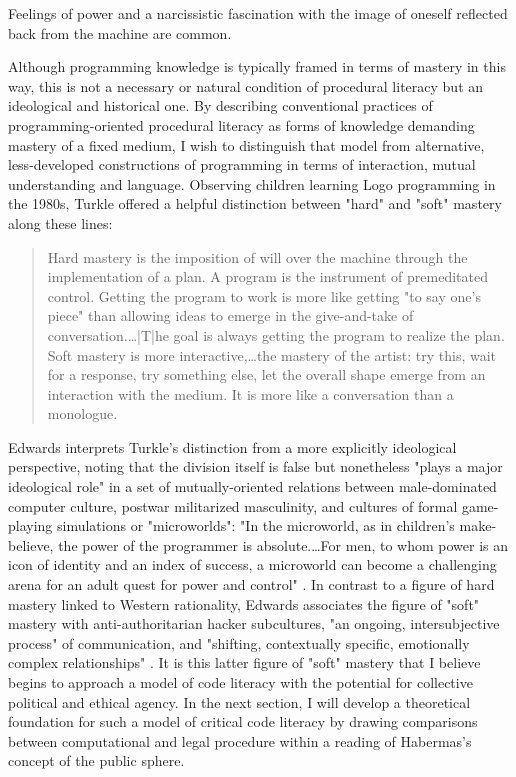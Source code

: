 \begin{quoting}
Feelings of power and a narcissistic fascination with the image of oneself reflected back from the machine are common. \autocite[13]{Kay1977}
\end{quoting}
Although programming knowledge is typically framed in terms of mastery in this way, this is not a necessary or natural condition of procedural literacy but an ideological and historical one. By describing conventional practices of programming-oriented procedural literacy as forms of knowledge demanding mastery of a fixed medium, I wish to distinguish that model from alternative, less-developed constructions of programming in terms of interaction, mutual understanding and language. Observing children learning Logo programming in the 1980s, Turkle offered a helpful distinction between "hard" and "soft" mastery along these lines:
\blockcquote[qtd.~in][101]{Edwards1990}{
  Hard mastery is the imposition of will over the machine through the implementation of a plan. A program is the instrument of premeditated control. Getting the program to work is more like getting "to say one's piece" than allowing ideas to emerge in the give-and-take of conversation.…|T|he goal is always getting the program to realize the plan. Soft mastery is more interactive,…the mastery of the artist: try this, wait for a response, try something else, let the overall shape emerge from an interaction with the medium. It is more like a conversation than a monologue.
}
Edwards interprets Turkle's distinction from a more explicitly ideological perspective, noting that the division itself is false but nonetheless "plays a major ideological role" in a set of mutually-oriented relations between male-dominated computer culture, postwar militarized masculinity, and cultures of formal game-playing simulations or "microworlds": "In the microworld, as in children's make-believe, the power of the programmer is absolute.…For men, to whom power is an icon of identity and an index of success, a microworld can become a challenging arena for an adult quest for power and control" \autocite[109--10]{Edwards1990}. In contrast to a figure of hard mastery linked to Western rationality, Edwards associates the figure of "soft" mastery with anti-authoritarian hacker subcultures, "an ongoing, intersubjective process" of communication, and "shifting, contextually specific, emotionally complex relationships" \autocite[107]{Edwards1990}. It is this latter figure of "soft" mastery that I believe begins to approach a model of code literacy with the potential for collective political and ethical agency. In the next section, I will develop a theoretical foundation for such a model of critical code literacy by drawing comparisons between computational and legal procedure within a reading of Habermas's concept of the public sphere.

